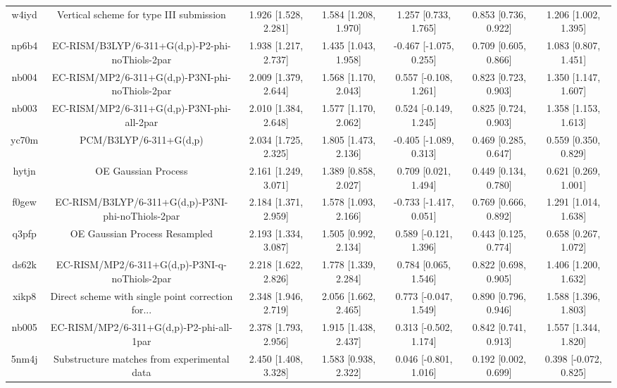 \documentclass{article}
\begin{document}
\begin{center}
\begin{longtable}{|ccccccc|}
 w4iyd &            Vertical scheme for type III submission &  1.926 [1.528, 2.281] &  1.584 [1.208, 1.970] &     1.257 [0.733, 1.765] &  0.853 [0.736, 0.922] &   1.206 [1.002, 1.395] \\
 np6b4 &    EC-RISM/B3LYP/6-311+G(d,p)-P2-phi-noThiols-2par &  1.938 [1.217, 2.737] &  1.435 [1.043, 1.958] &   -0.467 [-1.075, 0.255] &  0.709 [0.605, 0.866] &   1.083 [0.807, 1.451] \\
 nb004 &    EC-RISM/MP2/6-311+G(d,p)-P3NI-phi-noThiols-2par &  2.009 [1.379, 2.644] &  1.568 [1.170, 2.043] &    0.557 [-0.108, 1.261] &  0.823 [0.723, 0.903] &   1.350 [1.147, 1.607] \\
 nb003 &         EC-RISM/MP2/6-311+G(d,p)-P3NI-phi-all-2par &  2.010 [1.384, 2.648] &  1.577 [1.170, 2.062] &    0.524 [-0.149, 1.245] &  0.825 [0.724, 0.903] &   1.358 [1.153, 1.613] \\
 yc70m &                             PCM/B3LYP/6-311+G(d,p) &  2.034 [1.725, 2.325] &  1.805 [1.473, 2.136] &   -0.405 [-1.089, 0.313] &  0.469 [0.285, 0.647] &   0.559 [0.350, 0.829] \\
 hytjn &                                OE Gaussian Process &  2.161 [1.249, 3.071] &  1.389 [0.858, 2.027] &     0.709 [0.021, 1.494] &  0.449 [0.134, 0.780] &   0.621 [0.269, 1.001] \\
 f0gew &  EC-RISM/B3LYP/6-311+G(d,p)-P3NI-phi-noThiols-2par &  2.184 [1.371, 2.959] &  1.578 [1.093, 2.166] &   -0.733 [-1.417, 0.051] &  0.769 [0.666, 0.892] &   1.291 [1.014, 1.638] \\
 q3pfp &                      OE Gaussian Process Resampled &  2.193 [1.334, 3.087] &  1.505 [0.992, 2.134] &    0.589 [-0.121, 1.396] &  0.443 [0.125, 0.774] &   0.658 [0.267, 1.072] \\
 ds62k &      EC-RISM/MP2/6-311+G(d,p)-P3NI-q-noThiols-2par &  2.218 [1.622, 2.826] &  1.778 [1.339, 2.284] &     0.784 [0.065, 1.546] &  0.822 [0.698, 0.905] &   1.406 [1.200, 1.632] \\
 xikp8 &  Direct scheme with single point correction for... &  2.348 [1.946, 2.719] &  2.056 [1.662, 2.465] &    0.773 [-0.047, 1.549] &  0.890 [0.796, 0.946] &   1.588 [1.396, 1.803] \\
 nb005 &           EC-RISM/MP2/6-311+G(d,p)-P2-phi-all-1par &  2.378 [1.793, 2.956] &  1.915 [1.438, 2.437] &    0.313 [-0.502, 1.174] &  0.842 [0.741, 0.913] &   1.557 [1.344, 1.820] \\
 5nm4j &        Substructure matches from experimental data &  2.450 [1.408, 3.328] &  1.583 [0.938, 2.322] &    0.046 [-0.801, 1.016] &  0.192 [0.002, 0.699] &  0.398 [-0.072, 0.825] \\

\end{longtable}
\end{center}
\end{document}
